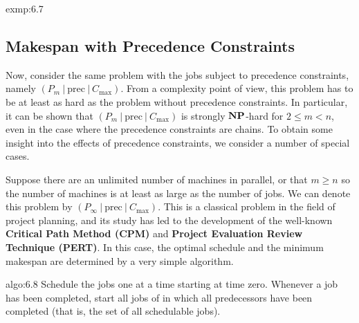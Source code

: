 \begin{exmp}{exmp:6.7}
\begin{center}
    \end{center}
    \vspace{-0.4cm}
\end{exmp}

\subsection{Makespan with Precedence Constraints} \label{subsec:6.2}
Now, consider the same problem with the jobs subject to precedence constraints,
namely $(P_m~|~\text{prec}~|~C_{\max})$. From a complexity point of view, this 
problem has to be at least as hard as the problem without precedence constraints.
In particular, it can be shown that $(P_m~|~\text{prec}~|~C_{\max})$ is 
strongly $\operatorname{\textbf{NP}}$-hard for $2 \leq m < n$, even in the case where the precedence 
constraints are chains. To obtain some insight into the effects of precedence 
constraints, we consider a number of special cases. 

Suppose there are an unlimited number of machines in parallel, or that 
$m \geq n$ so the number of machines is at least as large as the number of jobs.
We can denote this problem by $(P_\infty~|~\text{prec}~|~C_{\max})$. This 
is a classical problem in the field of project planning, and its study 
has led to the development of the well-known {\bf Critical Path Method 
(CPM)} and {\bf Project Evaluation Review Technique (PERT)}. In this case, 
the optimal schedule and the minimum makespan are determined by a very simple 
algorithm. 

\begin{algo}{algo:6.8}
    Schedule the jobs one at a time starting at time zero. Whenever a job has 
    been completed, start all jobs of in which all predecessors have been 
    completed (that is, the set of all schedulable jobs).
\end{algo}

